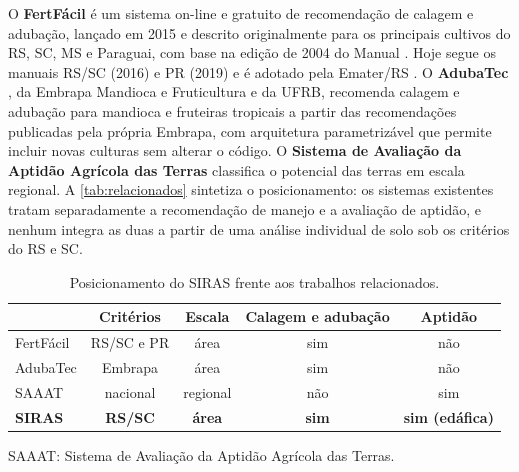 O \textbf{FertFácil} é um sistema on-line e gratuito de recomendação de calagem e adubação,
lançado em 2015 \citep{MaisSoja2026} e descrito originalmente para os principais cultivos do RS,
SC, MS e Paraguai, com base na edição de 2004 do Manual \citep{Tiecher2016}. Hoje segue os manuais
RS/SC (2016) e PR (2019) e é adotado pela Emater/RS \citep{FertFacil2026}. O \textbf{AdubaTec} \citep{AdubaTec2021}, da Embrapa Mandioca e Fruticultura e da
UFRB, recomenda calagem e adubação para mandioca e fruteiras tropicais a partir das recomendações
publicadas pela própria Embrapa, com arquitetura parametrizável que permite incluir novas culturas
sem alterar o código. O \textbf{Sistema de Avaliação da Aptidão
Agrícola das Terras} \citep{RamalhoFilhoBeek1995, EmbrapaAptidao2025} classifica o potencial
das terras em escala regional. A \autoref{tab:relacionados} sintetiza o posicionamento: os
sistemas existentes tratam separadamente a recomendação de manejo e a avaliação de aptidão, e
nenhum integra as duas a partir de uma análise individual de solo sob os critérios do RS e SC.

\begin{table}[htb]
\centering
\caption{Posicionamento do SIRAS frente aos trabalhos relacionados.}
\label{tab:relacionados}
\footnotesize
\begin{tabularx}{\columnwidth}{@{}lCCCC@{}}
\toprule
 & \textbf{Critérios} & \textbf{Escala} & \textbf{Calagem e adubação} & \textbf{Aptidão} \\
\midrule
FertFácil  & RS/SC e PR & área & sim & não \\
AdubaTec   & Embrapa & área  & sim & não \\
SAAAT      & nacional & regional & não & sim \\
\textbf{SIRAS} & \textbf{RS/SC} & \textbf{área} & \textbf{sim} & \textbf{sim (edáfica)} \\
\bottomrule
\end{tabularx}

\vspace{2pt}
\raggedright\scriptsize SAAAT: Sistema de Avaliação da Aptidão Agrícola das Terras.
\end{table}
